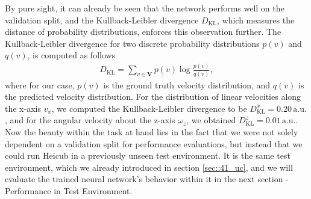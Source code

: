 By pure sight, it can already be seen that the network performs well on the validation split, and the Kullback-Leibler divergence $D_\text{KL}$, which measures the distance of probability distributions, enforces this observation further. The Kullback-Leibler divergence for two discrete probability distributions $p(v)$ and $q(v)$, is computed as follows
\begin{align}
	D_\text{KL} = \sum_{v\in \bm{V}}p(v)\log\frac{p(v)}{q(v)},
\end{align}
where for our case, $p(v)$ is the ground truth velocity distribution, and $q(v)$ is the predicted velocity distribution. For the distribution of linear velocities along the x-axis $v_x$, we computed the Kullback-Leibler divergence to be $D^x_\text{KL}=0.20\,\text{a.u.}$, and for the angular velocity about the z-axis $\omega_z$, we obtained $D^z_\text{KL}=0.01\,\text{a.u.}$. Now the beauty within the task at hand lies in the fact that we were not solely dependent on a validation split for performance evaluations, but instead that we could run Heicub in a previously unseen test environment. It is the same test environment, which we already introduced in section \ref{sec::41_uc}, and we will evaluate the trained neural network's behavior within it in the next section - Performance in Test Environment.
\FloatBarrier
